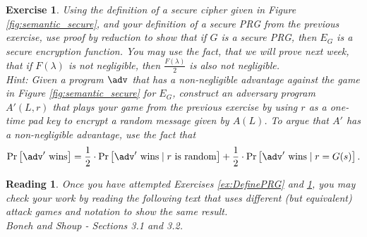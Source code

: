 \documentclass[12pt]{article}
\newcommand{\pr}[1]{\text{Pr}\left[#1\right]}
\newtheorem{exercise}{Exercise}
\newtheorem{reading}{Reading}
\theoremstyle{definition}
\theoremstyle{remark}
\theoremstyle{definition}
\begin{document}
\begin{exercise}\label{ex:SecureStreamCipher}
Using the definition of a secure cipher given in Figure \ref{fig:semantic_secure}, and your definition of a secure PRG from the previous exercise, use proof by reduction to show that if $G$ is a secure PRG, then $E_G$ is a secure encryption function. You may use the fact, that we will prove next week, that if $F(\lambda)$ is not negligible, then $\frac{F(\lambda)}{2}$ is also not negligible.\\
Hint: Given a program $\adv$ that has a non-negligible advantage against the game in Figure \ref{fig:semantic_secure} for $E_G$, construct an adversary program $A'(L, r)$ that plays your game from the previous exercise by using $r$ as a one-time pad key to encrypt a random message given by $A(L)$. To argue that $A'$ has a non-negligible advantage, use the fact that $$\pr{\adv'\text{ wins}} = \frac{1}{2}\cdot \pr{\adv'\text{ wins}\mid r\text{ is random}} + \frac{1}{2}\cdot \pr{\adv'\text{ wins}\mid r=G(s)}.$$
\end{exercise}

\begin{reading}
Once you have attempted Exercises \ref{ex:DefinePRG} and \ref{ex:SecureStreamCipher}, you may check your work by reading the following text that uses different (but equivalent) attack games and notation to show the same result.\\
Boneh and Shoup - Sections 3.1 and 3.2.
\end{reading}
\end{document}
